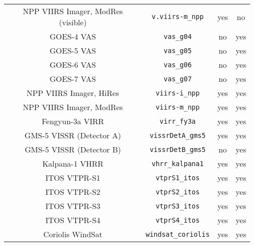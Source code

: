 \begin{center}
\begin{longtable}{c c c c}
  NPP VIIRS Imager, ModRes (visible) & \texttt{v.viirs-m\_npp}      &  yes     &  no        \\
  GOES-4 VAS                         & \texttt{vas\_g04}            &  no      &  yes       \\
  GOES-5 VAS                         & \texttt{vas\_g05}            &  no      &  yes       \\
  GOES-6 VAS                         & \texttt{vas\_g06}            &  no      &  yes       \\
  GOES-7 VAS                         & \texttt{vas\_g07}            &  no      &  yes       \\
  NPP VIIRS Imager, HiRes            & \texttt{viirs-i\_npp}        &  yes     &  yes       \\
  NPP VIIRS Imager, ModRes           & \texttt{viirs-m\_npp}        &  yes     &  yes       \\
  Fengyun-3a VIRR                    & \texttt{virr\_fy3a}          &  yes     &  yes       \\
  GMS-5 VISSR (Detector A)           & \texttt{vissrDetA\_gms5}     &  yes     &  yes       \\
  GMS-5 VISSR (Detector B)           & \texttt{vissrDetB\_gms5}     &  no      &  yes       \\
  Kalpana-1 VHRR                     & \texttt{vhrr\_kalpana1}      &  yes     &  yes       \\
  ITOS VTPR-S1                       & \texttt{vtprS1\_itos}        &  yes     &  yes       \\
  ITOS VTPR-S2                       & \texttt{vtprS2\_itos}        &  yes     &  yes       \\
  ITOS VTPR-S3                       & \texttt{vtprS3\_itos}        &  yes     &  yes       \\
  ITOS VTPR-S4                       & \texttt{vtprS4\_itos}        &  yes     &  yes       \\
  Coriolis WindSat                   & \texttt{windsat\_coriolis}   &  yes     &  yes       \\

\end{longtable}
\end{center}
